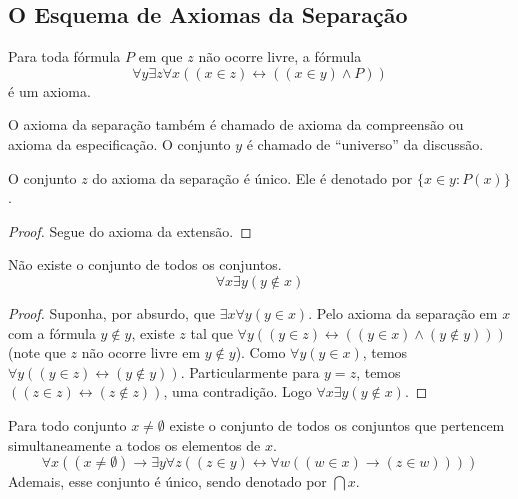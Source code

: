 \subsection{O Esquema de Axiomas da Separação}

\begin{axiom}[da Separação] \label{ax:6}
    Para toda fórmula $P$ em que $z$ não ocorre livre, a fórmula
        \[
            \boxed{
                \forall y \exists z \forall x ( (x \in z) \leftrightarrow ((x \in y) \land P) )
            }    
        \]
    é um axioma.
\end{axiom}

\begin{remark}
    O axioma da separação também é chamado de axioma da compreensão ou axioma da especificação. O conjunto $y$ é chamado de ``universo'' da discussão.
\end{remark}

\begin{proposition}
    O conjunto $z$ do axioma da separação é único. Ele é denotado por $\{x \in y : P(x) \}$.
\end{proposition}

\begin{proof}
    Segue do axioma da extensão. \blackproof
\end{proof}

\begin{theorem} Não existe o conjunto de todos os conjuntos.
        \[
            \forall x \exists y (y \notin x)
        \]
\end{theorem}

\begin{proof}
    Suponha, por absurdo, que $\exists x \forall y (y \in x)$. Pelo axioma da separação em $x$ com a fórmula $y \notin y$, existe $z$ tal que $\forall y ( (y \in z) \leftrightarrow ((y \in x) \land (y \notin y)))$ (note que $z$ não ocorre livre em $y \notin y$). Como $\forall y (y \in x)$, temos $\forall y ((y \in z) \leftrightarrow (y \notin y))$. Particularmente para $y = z$, temos $((z \in z) \leftrightarrow (z \notin z))$, uma contradição. Logo $\forall x \exists y (y \notin x)$. \blackproof
\end{proof}

\begin{theorem} \label{teo.set:intfamilia}
    Para todo conjunto $x \neq \emptyset$ existe o conjunto de todos os conjuntos que pertencem simultaneamente a todos os elementos de $x$.
        \[
            \forall x ((x \neq \emptyset) \rightarrow \exists y \forall z ((z \in y) \leftrightarrow \forall w ( (w \in x) \rightarrow (z \in w))))
        \]
    Ademais, esse conjunto é único, sendo denotado por $\bigcap x$.
\end{theorem}


